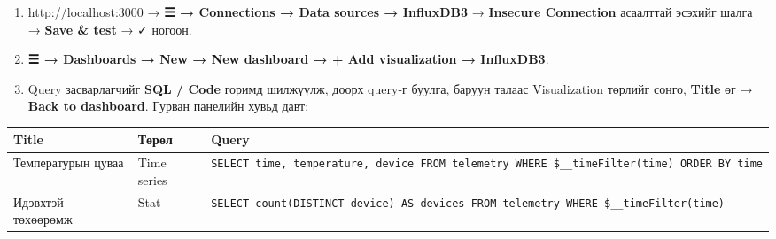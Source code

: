 \begin{enumerate}
\def\labelenumi{\arabic{enumi}.}
\tightlist
\item
  http://localhost:3000 → \textbf{☰ → Connections → Data sources → InfluxDB3} → \textbf{Insecure Connection} асаалттай эсэхийг шалга → \textbf{Save \& test} → ✓ ногоон.
\item
  \textbf{☰ → Dashboards → New → New dashboard → + Add visualization → InfluxDB3}.
\item
  Query засварлагчийг \textbf{SQL / Code} горимд шилжүүлж, доорх query-г буулга, баруун талаас Visualization төрлийг сонго, \textbf{Title} өг → \textbf{Back to dashboard}. Гурван панелийн хувьд давт:
\end{enumerate}

\begingroup\scriptsize\begin{longtable}[]{@{}lll@{}}
\toprule
\begin{minipage}[b]{0.30\columnwidth}\raggedright
Title\strut
\end{minipage} & \begin{minipage}[b]{0.30\columnwidth}\raggedright
Төрөл\strut
\end{minipage} & \begin{minipage}[b]{0.30\columnwidth}\raggedright
Query\strut
\end{minipage}\tabularnewline
\midrule
\endhead
\begin{minipage}[t]{0.30\columnwidth}\raggedright
Температурын цуваа\strut
\end{minipage} & \begin{minipage}[t]{0.30\columnwidth}\raggedright
Time series\strut
\end{minipage} & \begin{minipage}[t]{0.30\columnwidth}\raggedright
\texttt{SELECT\ time,\ temperature,\ device\ FROM\ telemetry\ WHERE\ \$\_\allowbreak{}\_\allowbreak{}timeFilter(time)\ ORDER\ BY\ time}\strut
\end{minipage}\tabularnewline
\begin{minipage}[t]{0.30\columnwidth}\raggedright
Идэвхтэй төхөөрөмж\strut
\end{minipage} & \begin{minipage}[t]{0.30\columnwidth}\raggedright
Stat\strut
\end{minipage} & \begin{minipage}[t]{0.30\columnwidth}\raggedright
\texttt{SELECT\ count(DISTINCT\ device)\ AS\ devices\ FROM\ telemetry\ WHERE\ \$\_\allowbreak{}\_\allowbreak{}timeFilter(time)}\strut
\end{minipage}\tabularnewline

\end{longtable}
